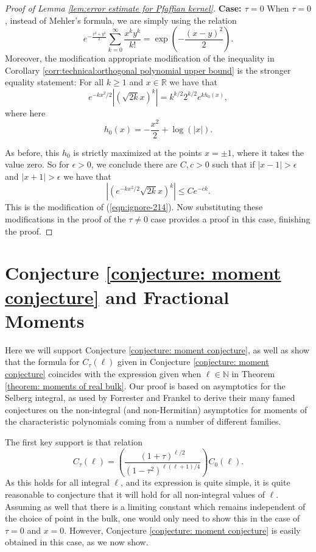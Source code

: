 \documentclass[12pt]{article}
\newcommand{\N}{\mathbb{N}}
\newcommand{\R}{\mathbb{R}}
\numberwithin{info}{section}
\numberwithin{equation}{section}
\renewcommand{\[}{\begin{equation}}
\renewcommand{\]}{\end{equation}}
\newcommand{\<}{\langle}
\renewcommand{\>}{\rangle}
\begin{document}
\begin{proof}[Proof of Lemma \ref{lem:error estimate for Pfaffian kernel}]
		\textbf{Case: $\tau= 0$} When $\tau=0$, instead of Mehler's formula, we are simply using the relation
		\[e^{-\frac{x^2+y^2}{2}}\sum_{k=0}^\infty\frac{x^ky^k}{k!}=\exp\left(-\frac{(x-y)^2}{2}\right).\]
		Moreover, the modification appropriate modification of the inequality in Corollary \ref{corr:technical:orthogonal polynomial upper bound} is the stronger equality statement: For all $k\ge 1$ and $x\in \R$ we have that
		\[e^{-kx^2/2}|\left(\sqrt{2k}x\right)^k|= k^{k/2}2^{k/2}e^{kh_0(x)},\]
		where here
		\[h_0(x)=-\frac{x^2}{2}+\log(|x|).\]
		
		
		As before, this $h_0$ is strictly maximized at the points $x=\pm 1$, where it takes the value zero. So for $\epsilon>0$, we conclude there are $C,c>0$ such that if $|x-1|>\epsilon$ and $|x+1|>\epsilon$ we have that
		\[|\left(e^{-kx^2/2}\sqrt{2k}x\right)^k|\le Ce^{-ck}.\]
		This is the modification of (\ref{eqn:ignore-214}). Now substituting these modifications in the proof of the $\tau\neq 0$ case provides a proof in this case, finishing the proof.
	\end{proof}
	
	\appendix
	
	\section{Conjecture \ref{conjecture: moment conjecture} and Fractional Moments \label{section:appendix:conjecture}}
	
	Here we will support Conjecture \ref{conjecture: moment conjecture}, as well as show that the formula for $C_{\tau}(\ell)$ given in Conjecture \ref{conjecture: moment conjecture} coincides with the expression given when $\ell\in \N$ in Theorem \ref{theorem: moments of real bulk}. Our proof is based on asymptotics for the Selberg integral, as used by Forrester and Frankel \cite{forrester-fischer-hartwig-asymptotics} to derive their many famed conjectures on the non-integral (and non-Hermitian) asymptotics for moments of the characteristic polynomials coming from a number of different families.
	
	The first key support is that relation
	\[C_{\tau}(\ell)=\left(\frac{(1+\tau)^{\ell/2}}{(1-\tau^2)^{\ell(\ell+1)/4}}\right)C_0(\ell).\]
	As this holds for all integral $\ell$, and its expression is quite simple, it is quite reasonable to conjecture that it will hold for all non-integral values of $\ell$. Assuming as well that there is a limiting constant which remains independent of the choice of point in the bulk, one would only need to show this in the case of $\tau=0$ and $x=0$. However, Conjecture \ref{conjecture: moment conjecture} is easily obtained in this case, as we now show.
	
\end{document}
